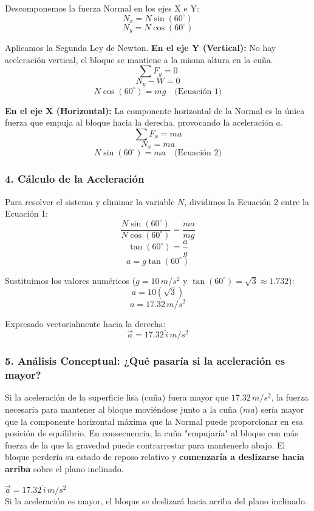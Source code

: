 \documentclass[12pt, a4paper]{article}
\begin{document}
Descomponemos la fuerza Normal en los ejes X e Y:
$$ N_x = N \sin(60^\circ) $$
$$ N_y = N \cos(60^\circ) $$

Aplicamos la Segunda Ley de Newton.
\textbf{En el eje Y (Vertical):}
No hay aceleración vertical, el bloque se mantiene a la misma altura en la cuña.
$$ \sum F_y = 0 $$
$$ N_y - W = 0 $$
$$ N \cos(60^\circ) = m g \quad \text{(Ecuación 1)} $$

\textbf{En el eje X (Horizontal):}
La componente horizontal de la Normal es la única fuerza que empuja al bloque hacia la derecha, provocando la aceleración $a$.
$$ \sum F_x = m a $$
$$ N_x = m a $$
$$ N \sin(60^\circ) = m a \quad \text{(Ecuación 2)} $$

\subsubsection*{4. Cálculo de la Aceleración}
Para resolver el sistema y eliminar la variable $N$, dividimos la Ecuación 2 entre la Ecuación 1:
$$ \frac{N \sin(60^\circ)}{N \cos(60^\circ)} = \frac{m a}{m g} $$
$$ \tan(60^\circ) = \frac{a}{g} $$
$$ a = g \tan(60^\circ) $$

Sustituimos los valores numéricos ($g = 10 \, \si{m/s^2}$ y $\tan(60^\circ) = \sqrt{3} \approx 1.732$):
$$ a = 10 (\sqrt{3}) $$
$$ a = 17.32 \, \si{m/s^2} $$

Expresado vectorialmente hacia la derecha:
$$ \vec{a} = 17.32 \, \hat{i} \, \si{m/s^2} $$

\subsubsection*{5. Análisis Conceptual: ¿Qué pasaría si la aceleración es mayor?}
Si la aceleración de la superficie lisa (cuña) fuera mayor que $17.32 \, \si{m/s^2}$, la fuerza necesaria para mantener al bloque moviéndose junto a la cuña ($m a$) sería mayor que la componente horizontal máxima que la Normal puede proporcionar en esa posición de equilibrio.
En consecuencia, la cuña "empujaría" al bloque con más fuerza de la que la gravedad puede contrarrestar para mantenerlo abajo. El bloque perdería su estado de reposo relativo y \textbf{comenzaría a deslizarse hacia arriba} sobre el plano inclinado.

\begin{tcolorbox}[colback=green!5!white, colframe=green!50!black, title=Respuesta Final]
\centering
$\vec{a} = 17.32 \, \hat{i} \, \si{m/s^2}$ \\
Si la aceleración es mayor, el bloque se deslizará hacia arriba del plano inclinado.
\end{tcolorbox}
\end{document}
